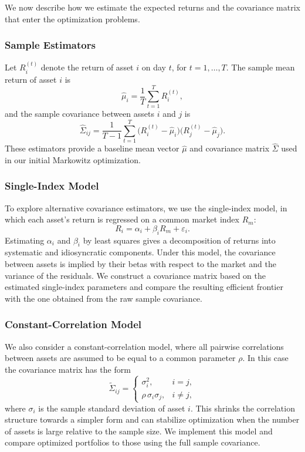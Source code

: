 \documentclass[12pt]{article}
\begin{document}
We now describe how we estimate the expected returns and the covariance matrix that enter the optimization problems.

\subsubsection{Sample Estimators}

Let $R_i^{(t)}$ denote the return of asset $i$ on day $t$, for $t = 1,\dots,T$. The sample mean return of asset $i$ is
\begin{equation}
    \hat{\mu}_i = \frac{1}{T} \sum_{t=1}^{T} R_i^{(t)},
\end{equation}
and the sample covariance between assets $i$ and $j$ is
\begin{equation}
    \hat{\Sigma}_{ij} 
    = \frac{1}{T-1} \sum_{t=1}^{T} 
        \big( R_i^{(t)} - \hat{\mu}_i \big)
        \big( R_j^{(t)} - \hat{\mu}_j \big).
\end{equation}
These estimators provide a baseline mean vector $\hat{\mu}$ and covariance matrix $\hat{\Sigma}$ used in our initial Markowitz optimization.

\subsubsection{Single-Index Model}

To explore alternative covariance estimators, we use the single-index model, in which each asset's return is regressed on a common market index $R_m$:
\begin{equation}
    R_i = \alpha_i + \beta_i R_m + \varepsilon_i.
\end{equation}
Estimating $\alpha_i$ and $\beta_i$ by least squares gives a decomposition of returns into systematic and idiosyncratic components. Under this model, the covariance between assets is implied by their betas with respect to the market and the variance of the residuals. We construct a covariance matrix based on the estimated single-index parameters and compare the resulting efficient frontier with the one obtained from the raw sample covariance.

\subsubsection{Constant-Correlation Model}

We also consider a constant-correlation model, where all pairwise correlations between assets are assumed to be equal to a common parameter $\rho$. In this case the covariance matrix has the form
\begin{equation}
    \tilde{\Sigma}_{ij} =
    \begin{cases}
        \sigma_i^{2}, & i = j, \\
        \rho \, \sigma_i \sigma_j, & i \neq j,
    \end{cases}
\end{equation}
where $\sigma_i$ is the sample standard deviation of asset $i$. This shrinks the correlation structure towards a simpler form and can stabilize optimization when the number of assets is large relative to the sample size. We implement this model and compare optimized portfolios to those using the full sample covariance.
\end{document}
